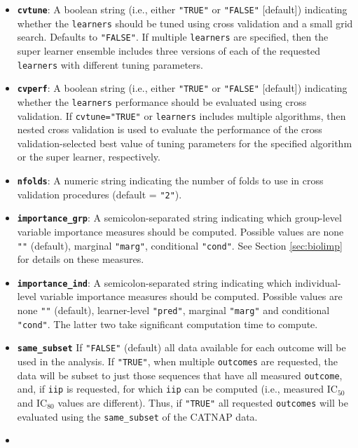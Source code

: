 \documentclass[]{article}
\begin{document}
\begin{itemize}
\item
  \textbf{\texttt{cvtune}}: A boolean string (i.e., either
  \texttt{"TRUE"} or \texttt{"FALSE"} {[}default{]}) indicating whether
  the \texttt{learners} should be tuned using cross validation and a
  small grid search. Defaults to \texttt{"FALSE"}. If multiple
  \texttt{learners} are specified, then the super learner ensemble
  includes three versions of each of the requested \texttt{learners}
  with different tuning parameters.
\item
  \textbf{\texttt{cvperf}}: A boolean string (i.e., either
  \texttt{"TRUE"} or \texttt{"FALSE"} {[}default{]}) indicating whether
  the \texttt{learners} performance should be evaluated using cross
  validation. If \texttt{cvtune="TRUE"} or \texttt{learners} includes
  multiple algorithms, then nested cross validation is used to evaluate
  the performance of the cross validation-selected best value of tuning
  parameters for the specified algorithm or the super learner,
  respectively.
\item
  \textbf{\texttt{nfolds}}: A numeric string indicating the number of
  folds to use in cross validation procedures (default = \texttt{"2"}).
\item
  \textbf{\texttt{importance\_grp}}: A semicolon-separated string
  indicating which group-level variable importance measures should be
  computed. Possible values are none \texttt{""} (default), marginal
  \texttt{"marg"}, conditional \texttt{"cond"}. See Section
  \ref{sec:biolimp} for details on these measures.
\item
  \textbf{\texttt{importance\_ind}}: A semicolon-separated string
  indicating which individual-level variable importance measures should
  be computed. Possible values are none \texttt{""} (default),
  learner-level \texttt{"pred"}, marginal \texttt{"marg"} and
  conditional \texttt{"cond"}. The latter two take significant
  computation time to compute.
\item
  \textbf{\texttt{same\_subset}} If \texttt{"FALSE"} (default) all data
  available for each outcome will be used in the analysis. If
  \texttt{"TRUE"}, when multiple \texttt{outcomes} are requested, the
  data will be subset to just those sequences that have all measured
  \texttt{outcome}, and, if \texttt{iip} is requested, for which
  \texttt{iip} can be computed (i.e., measured IC\(_{50}\) and
  IC\(_{80}\) values are different). Thus, if \texttt{"TRUE"} all
  requested \texttt{outcomes} will be evaluated using the
  \texttt{same\_subset} of the CATNAP data.
\item

\end{itemize}
\end{document}
